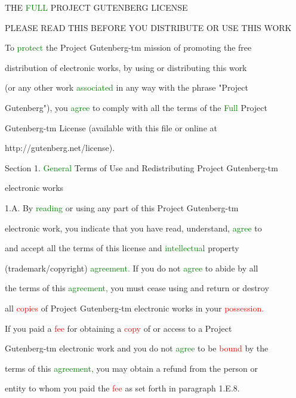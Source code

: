  THE \textcolor{green}{FULL} PROJECT GUTENBERG LICENSE

 PLEASE READ THIS BEFORE YOU DISTRIBUTE OR USE THIS WORK



 To \textcolor{green}{protect} the Project Gutenberg-tm mission of promoting the free

 distribution of electronic works, by using or distributing this work

 (or any other work \textcolor{green}{associated} in any way with the phrase "Project

 Gutenberg"), you \textcolor{green}{agree} to comply with all the terms of the \textcolor{green}{Full} Project

 Gutenberg-tm License (available with this file or online at

 http://gutenberg.net/license).





 Section 1. \textcolor{green}{General} Terms of Use and Redistributing Project Gutenberg-tm

 electronic works



 1.A. By \textcolor{green}{reading} or using any part of this Project Gutenberg-tm

 electronic work, you indicate that you have read, understand, \textcolor{green}{agree} to

 and accept all the terms of this license and \textcolor{green}{intellectual} property

 (trademark/copyright) \textcolor{green}{agreement.} If you do not \textcolor{green}{agree} to abide by all

 the terms of this \textcolor{green}{agreement,} you must cease using and return or destroy

 all \textcolor{red}{copies} of Project Gutenberg-tm electronic works in your \textcolor{red}{possession.}

 If you paid a \textcolor{red}{fee} for obtaining a \textcolor{red}{copy} of or access to a Project

 Gutenberg-tm electronic work and you do not \textcolor{green}{agree} to be \textcolor{red}{bound} by the

 terms of this \textcolor{green}{agreement,} you may obtain a refund from the person or

 entity to whom you paid the \textcolor{red}{fee} as set forth in paragraph 1.E.8.



